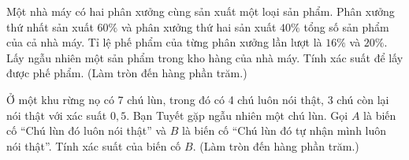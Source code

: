 \begin{ex}%
	Một nhà máy có hai phân xưởng cùng sản xuất một loại sản phẩm. Phân xưởng thứ nhất sản xuất $60 \%$ và phân xưởng thứ hai sản xuất $40 \%$ tổng số sản phẩm của cả nhà máy. Tỉ lệ phế phẩm của từng phân xưởng lần lượt là $16 \%$ và $20 \%$. Lấy ngẫu nhiên một sản phẩm trong kho hàng của nhà máy. Tính xác suất để lấy được phế phẩm.
	(Làm  tròn đến hàng phần trăm.)
\end{ex}

\begin{ex}%
	Ở một khu rừng nọ có 7 chú lùn, trong đó có 4 chú luôn nói thật, 3 chú còn lại nói thật với 
	xác suất $0{,}5$. Bạn Tuyết gặp ngẫu nhiên một chú lùn. Gọi $A$ là biến cố ``Chú lùn đó luôn
	nói thật'' và $B$ là biến cố ``Chú lùn đó tự nhận mình luôn nói thật''. Tính xác suất của  biến cố  $B$. (Làm  tròn đến hàng phần trăm.) 
\end{ex}

